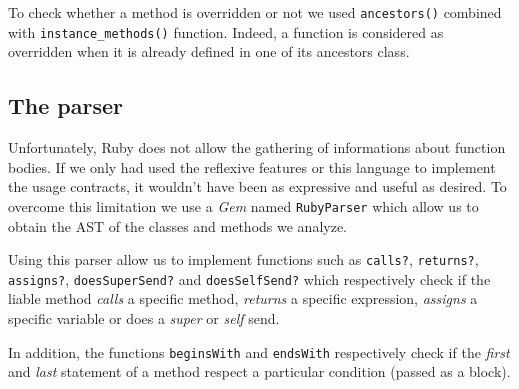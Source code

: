 To check whether a method is overridden or not we used \verb+ancestors()+ combined with \verb+instance_methods()+ function. Indeed, a function is considered as overridden when it is already defined in one of its ancestors class.


\subsection{The parser}
Unfortunately, Ruby does not allow the gathering of informations about function bodies. If we only had used the reflexive features or this language to implement the usage contracts, it wouldn't have been as expressive and useful as desired. To overcome this limitation we use a \emph{Gem} named \verb+RubyParser+ which allow us to obtain the AST of the classes and methods we analyze.

Using this parser allow us to implement functions such as \verb+calls?+, \verb+returns?+, \verb+assigns?+, \verb+doesSuperSend?+ and \verb+doesSelfSend?+ which respectively check if the liable method \emph{calls} a specific method, \emph{returns} a specific expression, \emph{assigns} a specific variable or does a \emph{super} or \emph{self} send.

In addition, the functions \verb+beginsWith+ and \verb+endsWith+ respectively check if the \emph{first} and \emph{last} statement of a method respect a particular condition (passed as a block).